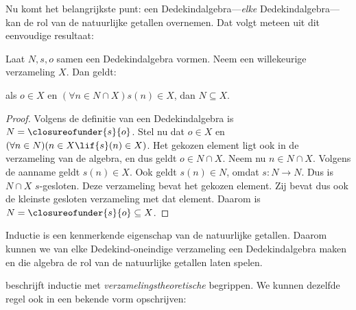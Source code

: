 \documentclass[openany]{memoir}
\begin{document}
\begingroup
\def\olfilename{OLP-0052}
\def\olfilepath{content/sets-functions-relations/infinite/}
\hypertarget{unit-OLP-0052}{}




Nu komt het belangrijkste punt: een Dedekindalgebra---\emph{elke}
Dedekindalgebra---kan de rol van de natuurlijke getallen overnemen. Dat
volgt meteen uit dit eenvoudige resultaat:

\begin{thm}
Laat $N, s, o$ samen een Dedekindalgebra vormen. Neem een willekeurige
verzameling $X$. Dan geldt:
	\begin{center}
		als $o \in X$ en $(\forall {n} \in N \cap X){s}({n}) \in X$, {dan} $N \subseteq X$.
	\end{center}
\end{thm}

\begin{proof}
Volgens de definitie van een Dedekindalgebra is $N =
\closureofunder{s}{o}$. Stel nu dat ${o} \in X$ en $(\forall {n} \in
N)(n \in X \lif {s}({n}) \in X)$. Het gekozen element ligt ook in
de verzameling van de algebra, en dus geldt ${o} \in N \cap X$.
Neem nu ${n} \in N \cap X$.
Volgens de aanname geldt ${s}({n}) \in X$. Ook geldt
${s}({n}) \in N$, omdat $s \colon N \to N$. Dus is $N \cap X$
$s$-gesloten. Deze verzameling bevat het gekozen element. Zij bevat dus
ook de kleinste gesloten verzameling met dat element. Daarom is $N =
\closureofunder{s}{o} \subseteq X$.
\end{proof}

Inductie is een kenmerkende eigenschap van de natuurlijke getallen.
Daarom kunnen we van elke Dedekind-oneindige verzameling een
Dedekindalgebra maken en die algebra de rol van de natuurlijke getallen
laten spelen.

 beschrijft inductie met
\emph{verzamelingstheoretische} begrippen. We kunnen dezelfde regel
ook in een bekende vorm opschrijven:
\end{document}
